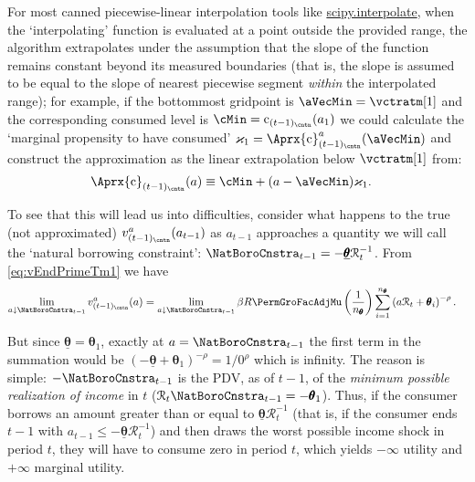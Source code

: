 \documentclass[titlepage, headings=optiontotocandhead]{Resources/texmf-local/tex/latex/econtex}
\begin{document}
For most canned piecewise-linear interpolation tools like \href{https://docs.scipy.org/doc/scipy/tutorial/interpolate.html}{scipy.interpolate}, when the `interpolating' function is evaluated at a point outside the provided range, the algorithm extrapolates under the assumption that the slope of the function remains constant beyond its measured boundaries (that is, the slope is assumed to be equal to the slope of nearest piecewise segment \emph{within} the interpolated range); for example, if the bottommost gridpoint is $\aVecMin = \vctratm[1]$ and the corresponding consumed level is $\cMin = \mathrm{c}_{(t-1)_\cntn}(a_1)$ we could calculate the `marginal propensity to have consumed' $\varkappa_{1}=
\Aprx{\mathrm{c}}_{(t-1)_\cntn}^{a}(\aVecMin)$ and construct the approximation as the linear extrapolation below $\vctratm[1]$ from:
\begin{equation}\begin{gathered}\begin{aligned}
      \Aprx{\mathrm{c}}_{(t-1)_\cntn}(a)  &  \equiv \cMin + (a-\aVecMin)\varkappa_{1}  \label{eq:ExtrapLin}.
    \end{aligned}\end{gathered}\end{equation}

To see that this will lead us into difficulties, consider what happens to the true (not approximated) $v^{a}_{(t-1)_\cntn}(a_{t-1})$ as $a_{t-1}$ approaches a quantity we will call the `natural borrowing constraint': $\NatBoroCnstra_{t-1}=-\underline{\pmb{\theta}}\mathcal{R}_{t}^{-1}$.  From
\eqref{eq:vEndPrimeTm1} we have
\begin{equation}\begin{gathered}\begin{aligned}
      \lim_{a \downarrow \NatBoroCnstra_{t-1}} v^{a}_{(t-1)_\cntn}(a)
      & =                                                                                         \lim_{a \downarrow \NatBoroCnstra_{t-1}} \beta R \PermGroFacAdjMu \left(\frac{1}{n_{\pmb{\theta}}}\right) \sum_{i=1}^{n_{\pmb{\theta}}} \left( a \mathcal{R}_{t}+ \pmb{\theta}_{i}\right)^{-\rho}.
    \end{aligned}\end{gathered}\end{equation}

But since $\underline{\pmb{\theta}}=\pmb{\theta}_{1}$, exactly at $a=\NatBoroCnstra_{t-1}$ the first term in the summation would be $(-\underline{\pmb{\theta}}+\pmb{\theta}_{1})^{-\rho}=1/0^{\rho}$ which is infinity.  The reason is simple: $-\NatBoroCnstra_{t-1}$ is the PDV, as of $t-1$, of the \emph{minimum possible realization of income} in $t$ ($\mathcal{R}_{t}\NatBoroCnstra_{t-1} = -\pmb{\theta}_{1}$).  Thus, if the consumer borrows an amount greater than or equal to $\underline{\pmb{\theta}}\mathcal{R}_{t}^{-1}$ (that is, if the consumer ends $t-1$ with $a_{t-1} \leq -\underline{\pmb{\theta}}\mathcal{R}_{t}^{-1}$) and then draws the worst possible income shock in period $t$, they will have to consume zero in period $t$, which yields $-\infty$ utility and $+\infty$ marginal utility.
\end{document}
